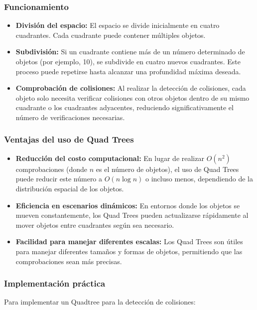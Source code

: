 \documentclass[9pt,a4paper,twoside]{rho-class/rho}
\begin{document}
        \subsubsection{Funcionamiento}
        \begin{itemize}
            \item \textbf{División del espacio:} El espacio se divide inicialmente en cuatro cuadrantes. Cada cuadrante puede contener múltiples objetos.
            
            \item \textbf{Subdivisión:} Si un cuadrante contiene más de un número determinado de objetos (por ejemplo, 10), se subdivide en cuatro nuevos cuadrantes. Este proceso puede repetirse hasta alcanzar una profundidad máxima deseada.
            
            \item \textbf{Comprobación de colisiones:} Al realizar la detección de colisiones, cada objeto solo necesita verificar colisiones con otros objetos dentro de su mismo cuadrante o los cuadrantes adyacentes, reduciendo significativamente el número de verificaciones necesarias.
        \end{itemize}

        \subsubsection{Ventajas del uso de Quad Trees}
        \begin{itemize}
            \item \textbf{Reducción del costo computacional:} En lugar de realizar $O(n^2)$ comprobaciones (donde $n$ es el número de objetos), el uso de Quad Trees puede reducir este número a $O(n\log n)$ o incluso menos, dependiendo de la distribución espacial de los objetos.
            
            \item \textbf{Eficiencia en escenarios dinámicos:} En entornos donde los objetos se mueven constantemente, los Quad Trees pueden actualizarse rápidamente al mover objetos entre cuadrantes según sea necesario.
            
            \item \textbf{Facilidad para manejar diferentes escalas:} Los Quad Trees son útiles para manejar diferentes tamaños y formas de objetos, permitiendo que las comprobaciones sean más precisas.
        \end{itemize}

        \subsubsection{Implementación práctica}
        Para implementar un Quadtree para la detección de colisiones:
\end{document}
